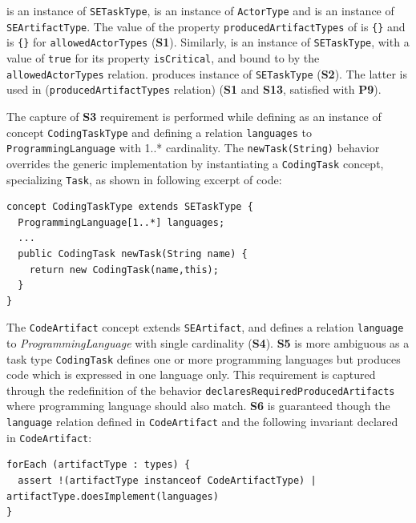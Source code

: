 
 is an instance of \texttt{SETaskType},  is an instance of \texttt{ActorType} and  is an instance of \texttt{SEArtifactType}. The value of the property \texttt{producedArtifactTypes} of  is \texttt{\{}\texttt{\}} and is \texttt{\{}\texttt{\}} for \texttt{allowedActorTypes} (\textbf{S1}). Similarly,  is an instance of \texttt{SETaskType}, with a value of \texttt{true} for its property \texttt{isCritical}, and bound to  by the \texttt{allowedActorTypes} relation.  produces  instance of \texttt{SETaskType} (\textbf{S2}). The latter is used in  (\texttt{producedArtifactTypes} relation) (\textbf{S1} and \textbf{S13}, satisfied with \textbf{P9}).

The capture of \textbf{S3} requirement is performed while defining  as an instance of concept \texttt{CodingTaskType} and defining a relation \texttt{languages} to \texttt{ProgrammingLanguage} with 1..* cardinality.
 The \texttt{newTask(String)} behavior overrides the generic implementation by instantiating a \texttt{CodingTask} concept, specializing \texttt{Task}, as shown in following excerpt of \FML code:

\begin{lstlisting}
concept CodingTaskType extends SETaskType {
  ProgrammingLanguage[1..*] languages;
  ...
  public CodingTask newTask(String name) {
    return new CodingTask(name,this);
  }
}
\end{lstlisting}

The \texttt{CodeArtifact} concept extends \texttt{SEArtifact}, and defines a relation \texttt{language} to \textit{ProgrammingLanguage} with single cardinality (\textbf{S4}).
\textbf{S5} is more ambiguous as a task type \texttt{CodingTask} defines one or more programming languages but produces code which is expressed in one language only. This requirement is captured through the redefinition of the behavior \texttt{declaresRequiredProducedArtifacts} where programming language should also match.
\textbf{S6} is guaranteed though the \texttt{language} relation defined in \texttt{CodeArtifact} and the following invariant declared in \texttt{CodeArtifact}:
\begin{lstlisting}
forEach (artifactType : types) {
  assert !(artifactType instanceof CodeArtifactType) | artifactType.doesImplement(languages)
}
\end{lstlisting}

